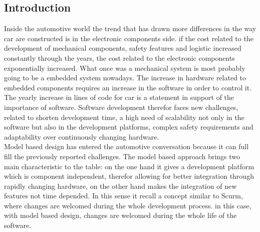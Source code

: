 \documentclass[../main.tex]{subfiles}
\begin{document}
\subsection{Introduction}
Inside the automotive world the trend that has drawn more differences in the way car are constructed is in the electronic components side. if the cost related to the development of mechanical components, safety features and logistic increased constantly through the years, the cost related to the electronic components exponentially increased. What once was a mechanical system is most probably going to be a embedded system nowadays. The increase in hardware related to embedded components requires an increase in the software in order to control it. The yearly increase in lines of code for car is a statement in support of the importance of software. 
Software development therefor faces new challenges, related to shorten development time, a high need of scalability  not only in the software but also in the development platforms, complex safety requirements and adaptability over continuously changing hardware.\\
Model based design has entered the automotive conversation because it can full fill the previously reported challenges. The model based approach brings two main characteristic to the table: on the one hand it gives a development platform which is component independent, therefor allowing for better integration through rapidly changing hardware, on the other hand makes the integration of new features not time depended. In this sense it recall a concept similar to Scurm, where changes are welcomed during the whole development process. in this case, with model based design, changes are welcomed during the whole life of the software.
\end{document}
